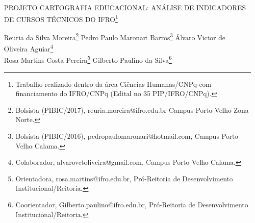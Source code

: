 \documentclass[article,12pt,onesidea,4paper,english,brazil]{abntex2}
\begin{document}
	
	
	\frenchspacing 
	
	\begin{center}
		\LARGE PROJETO CARTOGRAFIA EDUCACIONAL: ANÁLISE DE INDICADORES DE CURSOS TÉCNICOS DO IFRO\footnote{Trabalho realizado dentro da área Ciências Humanas/CNPq com financiamento do IFRO/CNPq
			(Edital no 35 PIP/IFRO/CNPq).}
		
		\normalsize
		Reuria da Silva Moreira\footnote{Bolsista (PIBIC/2017), reuria.moreira@ifro.edu.br Campus Porto Velho Zona Norte.} 
		Pedro Paulo Maronari Barros\footnote{Bolsista (PIBIC/2016), pedropaulomaronari@hotmail.com, Campus Porto Velho Calama.} 
		Álvaro Victor de Oliveira Aguiar\footnote{Colaborador, alvarovctoliveira@gmail.com, Campus Porto Velho Calama.} \\
		Rosa Martins Costa Pereira\footnote{Orientadora, rosa.martins@ifro.edu.br, Pró-Reitoria de Desenvolvimento Institucional/Reitoria.}
		Gilberto Paulino da Silva\footnote{Coorientador, Gilberto.paulino@ifro.edu.br, Pró-Reitoria de Desenvolvimento Institucional/Reitoria.} 
	\end{center}
	
\end{document}
